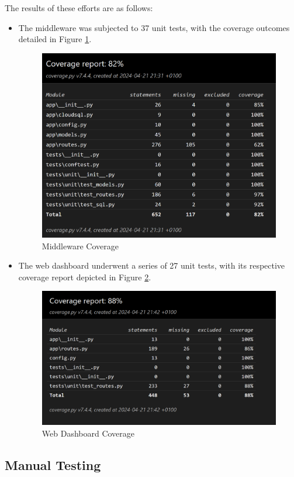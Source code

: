 \noindent The results of these efforts are as follows: 
\begin{itemize}
    \item The middleware was subjected to 37 unit tests, with the coverage outcomes detailed in Figure \ref{fig:middleware-coverage}.
    \begin{figure}[h!]
    \centering
    \includegraphics[width=0.7\linewidth]{images/middleware-coverage.png}
    \caption{Middleware Coverage}
    \label{fig:middleware-coverage}
\end{figure}
    \item The web dashboard underwent a series of 27 unit tests, with its respective coverage report depicted in Figure \ref{fig:web-dashboard-coverage}.
    \begin{figure}[h!]
    \centering
    \includegraphics[width=0.7\linewidth]{images/webdashboard-coverage.png}
    \caption{Web Dashboard Coverage}
    \label{fig:web-dashboard-coverage}
\end{figure} 
\end{itemize}



\newpage
\subsection{Manual Testing}

